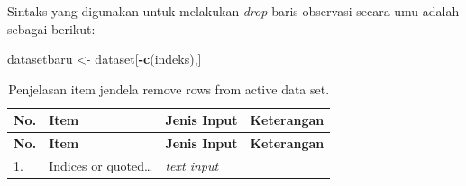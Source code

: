 \documentclass[12pt,]{krantz}
\newenvironment{Shaded}{\begin{snugshade}}{\end{snugshade}}
\newcommand{\KeywordTok}[1]{\textcolor[rgb]{0.13,0.29,0.53}{\textbf{#1}}}
\newcommand{\NormalTok}[1]{#1}
\newcommand{\OperatorTok}[1]{\textcolor[rgb]{0.81,0.36,0.00}{\textbf{#1}}}
\newcommand{\StringTok}[1]{\textcolor[rgb]{0.31,0.60,0.02}{#1}}
\begin{document}
Sintaks yang digunakan untuk melakukan \emph{drop} baris observasi secara umu adalah sebagai berikut:

\begin{Shaded}
\begin{Highlighting}[]
\NormalTok{datasetbaru <-}\StringTok{ }\NormalTok{dataset[}\OperatorTok{-}\KeywordTok{c}\NormalTok{(indeks),]}
\end{Highlighting}
\end{Shaded}

\begin{longtable}[]{@{}llll@{}}
\caption{\label{tab:remove} Penjelasan item jendela remove rows from active data set.}\tabularnewline
\toprule
\begin{minipage}[b]{0.04\columnwidth}\raggedright
\textbf{No.}\strut
\end{minipage} & \begin{minipage}[b]{0.14\columnwidth}\raggedright
\textbf{Item}\strut
\end{minipage} & \begin{minipage}[b]{0.09\columnwidth}\raggedright
\textbf{Jenis Input}\strut
\end{minipage} & \begin{minipage}[b]{0.61\columnwidth}\raggedright
\textbf{Keterangan}\strut
\end{minipage}\tabularnewline
\midrule
\endfirsthead
\toprule
\begin{minipage}[b]{0.04\columnwidth}\raggedright
\textbf{No.}\strut
\end{minipage} & \begin{minipage}[b]{0.14\columnwidth}\raggedright
\textbf{Item}\strut
\end{minipage} & \begin{minipage}[b]{0.09\columnwidth}\raggedright
\textbf{Jenis Input}\strut
\end{minipage} & \begin{minipage}[b]{0.61\columnwidth}\raggedright
\textbf{Keterangan}\strut
\end{minipage}\tabularnewline
\midrule
\endhead
\begin{minipage}[t]{0.04\columnwidth}\raggedright
1.\strut
\end{minipage} & \begin{minipage}[t]{0.14\columnwidth}\raggedright
Indices or quoted\ldots{}\strut
\end{minipage} & \begin{minipage}[t]{0.09\columnwidth}\raggedright
\emph{text input}\strut
\end{minipage} & \begin{minipage}[t]{0.61\columnwidth}\raggedright

\end{minipage}
\end{longtable}
\end{document}

